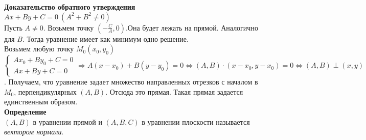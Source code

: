 \documentclass[12pt]{article}
\begin{document}
\textbf{Доказательство обратного утверждения}\\
$Ax+By+C=0\ (A^2+B^2\neq0)$\\
Пусть $A\neq 0$. Возьмем точку $(-\frac CA,0)$.Она будет лежать на прямой. Аналогично для $B$. Тогда уравнение имеет как минимум одно решение.\\
Возьмем любую точку $M_0(x_0,y_0)$\\
$\left\{\begin{array}{l}
    Ax_0+By_0+C=0  \\
    Ax+By+C=0 
\end{array}\right. \Rightarrow A(x-x_0)+B(y-y_0)=0 \Leftrightarrow (A,B)\cdot(x-x_0,y-x_0)=0 \Leftrightarrow (A,B)\perp (x,y)$. Получаем, что уравнение задает множество направленных отрезков с началом в $M_0$, перпендикулярных $(A,B)$. Отсюда это прямая. Такая прямая задается единственным образом.\\
\textbf{Определение}\\
$(A,B)$ в уравнении прямой и $(A,B,C)$ в уравнении плоскости называется \textit{вектором нормали}.
\end{document}
